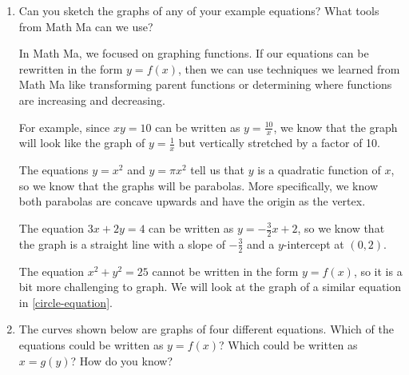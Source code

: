 \documentclass[main]{subfiles}
\begin{document}
\begin{enumerate}
\begin{solution}
\end{solution}

\end{enumerate}
\pspace{\newpage}


\begin{enumerate}[resume]

\item
\begin{problem}
Can you sketch the graphs of any of your example equations? What tools from Math Ma can we use?
\end{problem}
\pspace{\vfill}

\begin{solution}
    In Math Ma, we focused on graphing functions. If our equations can be rewritten in the form $y=f(x)$, then we can use techniques we learned from Math Ma like transforming parent functions or determining where functions are increasing and decreasing.

    For example, since $xy=10$ can be written as $y=\frac{10}{x}$, we know that the graph will look like the graph of $y=\frac{1}{x}$ but vertically stretched by a factor of 10.

    The equations $y=x^2$ and $y=\pi x^2$ tell us that $y$ is a quadratic function of $x$, so we know that the graphs will be parabolas. More specifically, we know both parabolas are concave upwards and have the origin as the vertex.

    The equation $3x+2y=4$ can be written as $y=-\frac{3}{2}x+2$, so we know that the graph is a straight line with a slope of $-\frac{3}{2}$ and a $y$-intercept at $(0,2)$.

    The equation $x^2+y^2=25$ cannot be written in the form $y=f(x)$, so it is a bit more challenging to graph. We will look at the graph of a similar equation in \ref{circle-equation}.
\end{solution}

\item 
\begin{problem}
The curves shown below are graphs of four different equations. Which of the equations could be written as $y=f(x)$? Which could be written as $x=g(y)$? How do you know?
\end{problem}


\end{enumerate}
\end{document}
